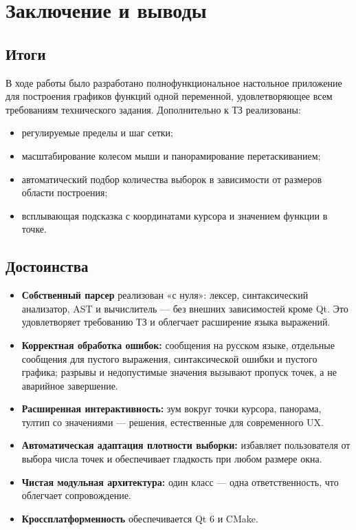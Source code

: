 \documentclass[a4paper, final]{article}
\begin{document}
\section{Заключение и выводы}

\subsection{Итоги}

В ходе работы было разработано полнофункциональное настольное приложение
для построения графиков функций одной переменной, удовлетворяющее
всем требованиям технического задания. Дополнительно к ТЗ реализованы:
\begin{itemize}
    \item регулируемые пределы и шаг сетки;
    \item масштабирование колесом мыши и панорамирование перетаскиванием;
    \item автоматический подбор количества выборок в зависимости от
          размеров области построения;
    \item всплывающая подсказка с координатами курсора и значением
          функции в точке.
\end{itemize}

\subsection{Достоинства}

\begin{itemize}
    \item \textbf{Собственный парсер} реализован «с нуля»: лексер,
          синтаксический анализатор, AST и вычислитель --- без внешних
          зависимостей кроме Qt. Это удовлетворяет требованию ТЗ
          и облегчает расширение языка выражений.
    \item \textbf{Корректная обработка ошибок:} сообщения на русском
          языке, отдельные сообщения для пустого выражения, синтаксической
          ошибки и пустого графика; разрывы и недопустимые значения
          вызывают пропуск точек, а не аварийное завершение.
    \item \textbf{Расширенная интерактивность:} зум вокруг точки курсора,
          панорама, тултип со значениями --- решения, естественные
          для современного UX.
    \item \textbf{Автоматическая адаптация плотности выборки:} избавляет
          пользователя от выбора числа точек и обеспечивает гладкость
          при любом размере окна.
    \item \textbf{Чистая модульная архитектура:} один класс ---
          одна ответственность, что облегчает сопровождение.
    \item \textbf{Кроссплатформенность} обеспечивается Qt 6 и CMake.
\end{itemize}
\end{document}
